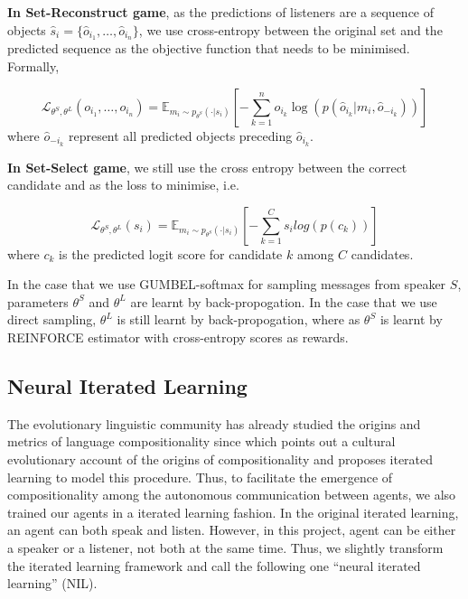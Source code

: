 \textbf{In Set-Reconstruct game}, as the predictions of listeners are a sequence of objects $\hat{s}_i=\{\hat{o}_{i_1}, \dots, \hat{o}_{i_n}\}$, we use cross-entropy between the original set and the predicted sequence as the objective function that needs to be minimised. Formally,

\begin{equation}
  \mathcal{L}_{\theta^S, \theta^L}(o_{i_1}, \dots, o_{i_n}) =\mathbb{E}_{m_i\sim p_{\theta^S}(\cdot|s_i)} \left[ -\sum_{k=1}^{n} o_{i_k} \log(p(\hat{o}_{i_k}|m_i, \hat{o}_{-i_k})) \right]
  \label{eq3.2.3.1:cross_entropy_seq}
\end{equation}
where $\hat{o}_{-i_k}$ represent all predicted objects preceding $\hat{o}_{i_k}$.

\noindent\textbf{In Set-Select game}, we still use the cross entropy between the correct candidate and  as the loss to minimise, i.e.

\begin{equation}
  \mathcal{L}_{\theta^S, \theta^L}(s_i) = \mathbb{E}_{m_i\sim p_{\theta^S}(\cdot|s_i)} \left[-\sum_{k=1}^{C} s_i log(p(c_k)) \right]
  \label{eq3.2.3.2:cross_entropy_choose}
\end{equation}
where $c_k$ is the predicted logit score for candidate $k$ among $C$ candidates.

In the case that we use GUMBEL-softmax for sampling messages from speaker $S$, parameters $\theta^S$ and $\theta^L$ are learnt by back-propogation. In the case that we use direct sampling, $\theta^L$ is still learnt by back-propogation, where as $\theta^S$ is learnt by REINFORCE estimator \cite{williams1992simple} with cross-entropy scores as rewards.

\subsection{Neural Iterated Learning}
\label{ssec3.2.4:iterated_learning}

The evolutionary linguistic community has already studied the origins and metrics of language compositionality since \cite{kirby2002emergence} which points out a cultural evolutionary account of the origins of compositionality and proposes iterated learning to model this procedure. Thus, to facilitate the emergence of compositionality among the autonomous communication between agents, we also trained our agents in a iterated learning fashion. In the original iterated learning, an agent can both speak and listen. However, in this project, agent can be either a speaker or a listener, not both at the same time. Thus, we slightly transform the iterated learning framework and call the following one ``neural iterated learning'' (NIL).

